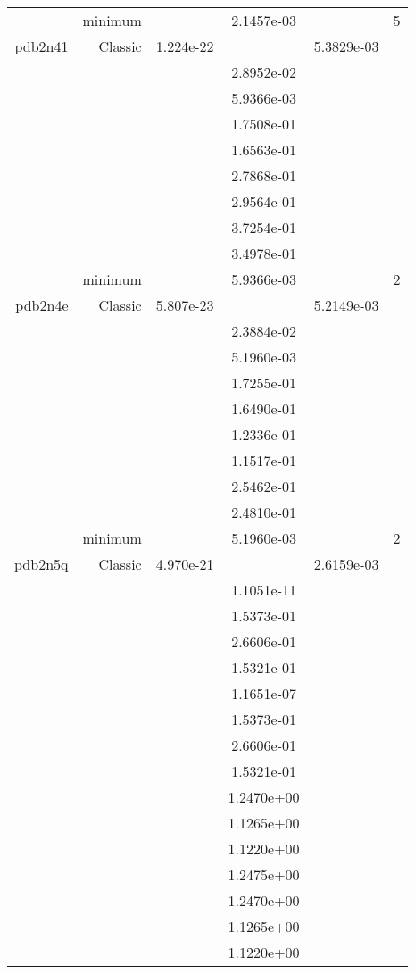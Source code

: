 \begin{xltabular}{\textwidth}{r|rS[table-format=1.3e+2]S[table-format=1.4e+2]S[table-format=1.4e+2]S[table-format=-1.5]}
& minimum &  & 2.1457e-03 & & 5 \\  \addlinespace
pdb2n41 & Classic & 1.224e-22 &  & 5.3829e-03 & \\
&  &  & 2.8952e-02 & & \\
&  &  & 5.9366e-03 & & \\
&  &  & 1.7508e-01 & & \\
&  &  & 1.6563e-01 & & \\
&  &  & 2.7868e-01 & & \\
&  &  & 2.9564e-01 & & \\
&  &  & 3.7254e-01 & & \\
&  &  & 3.4978e-01 & & \\
& minimum &  & 5.9366e-03 & & 2 \\  \addlinespace
pdb2n4e & Classic & 5.807e-23 &  & 5.2149e-03 & \\
&  &  & 2.3884e-02 & & \\
&  &  & 5.1960e-03 & & \\
&  &  & 1.7255e-01 & & \\
&  &  & 1.6490e-01 & & \\
&  &  & 1.2336e-01 & & \\
&  &  & 1.1517e-01 & & \\
&  &  & 2.5462e-01 & & \\
&  &  & 2.4810e-01 & & \\
& minimum &  & 5.1960e-03 & & 2 \\  \addlinespace
pdb2n5q & Classic & 4.970e-21 &  & 2.6159e-03 & \\
&  &  & 1.1051e-11 & & \\
&  &  & 1.5373e-01 & & \\
&  &  & 2.6606e-01 & & \\
&  &  & 1.5321e-01 & & \\
&  &  & 1.1651e-07 & & \\
&  &  & 1.5373e-01 & & \\
&  &  & 2.6606e-01 & & \\
&  &  & 1.5321e-01 & & \\
&  &  & 1.2470e+00 & & \\
&  &  & 1.1265e+00 & & \\
&  &  & 1.1220e+00 & & \\
&  &  & 1.2475e+00 & & \\
&  &  & 1.2470e+00 & & \\
&  &  & 1.1265e+00 & & \\
&  &  & 1.1220e+00 & & \\

\end{xltabular}

